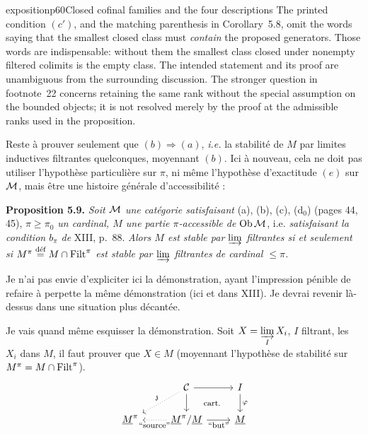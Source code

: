 \begin{dcomment}{exposition}{p60}{Closed cofinal families and the four descriptions}
The printed condition $(c')$, and the matching parenthesis in Corollary~5.8, omit the words saying that the smallest closed class must \emph{contain} the proposed generators. Those words are indispensable: without them the smallest class closed under nonempty filtered colimits is the empty class. The intended statement and its proof are unambiguous from the surrounding discussion. The stronger question in footnote~22 concerns retaining the same rank without the special assumption on the bounded objects; it is not resolved merely by the proof at the admissible ranks used in the proposition.
\end{dcomment}


Reste à prouver seulement que $(b) \Longrightarrow (a)$, \textit{i.e.} la stabilité de $M$ par limites inductives filtrantes quelconques, moyennant $(b)$. Ici à nouveau, cela ne doit pas utiliser l'hypothèse particulière sur $\pi$, ni même l'hypothèse d'exactitude $(e)$ sur $\mathcal{M}$, mais être une histoire générale d'accessibilité :

\textbf{Proposition 5.9.} \textit{Soit $\mathcal{M}$ une catégorie satisfaisant} (a), (b), (c), (d$_0$) (pages 44, 45), \textit{$\pi \geq \pi_0$ un cardinal, $M$ une partie $\pi$-accessible de} $\operatorname{Ob}\mathcal{M}$, i.e. \textit{satisfaisant la condition $b_\pi$ de} XIII, p.~88. \textit{Alors $M$ est stable par $\varinjlim$ filtrantes si et seulement si $M^\pi \overset{\text{déf}}{=} M \cap \mathrm{Filt}^\pi$ est stable par $\varinjlim$ filtrantes de cardinal $\leq \pi$.}

Je n'ai pas envie d'expliciter ici la démonstration, ayant l'impression pénible de refaire à perpette la même démonstration (ici et dans XIII). Je devrai revenir là-dessus dans une situation plus décantée.


Je vais quand même esquisser la démonstration. Soit $X = \varinjlim\limits_{I} X_i$, $I$ filtrant, les $X_i$ dans $M$, il faut prouver que $X \in M$ (moyennant l'hypothèse de stabilité sur $M^\pi = M \cap \mathrm{Filt}^\pi$).
\[
\begin{tikzcd}
& \Ci \arrow[r] \arrow[d] \arrow[dl, dotted, "\mathfrak{z}"'] \arrow[dr, phantom, "\text{\footnotesize cart.}"] & I \arrow[d, "\varphi"] \\
\underline{M}^\pi & \underline{M}^\pi/\underline{M} \arrow[l, dotted, "\text{\footnotesize “source”}"] \arrow[r, "\text{\footnotesize “but”}"'] & \underline{M}
\end{tikzcd}
\] %

